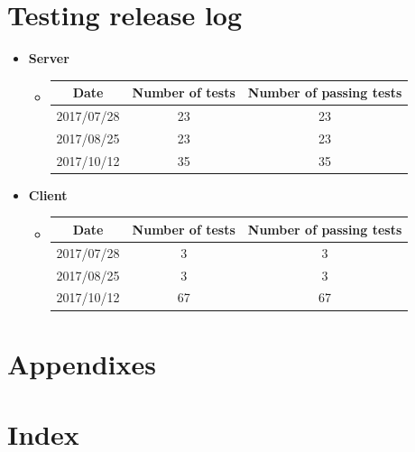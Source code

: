\documentclass[a4paper,12pt]{article}
\begin{document}
	\pagebreak
	\section{Testing release log}
	
	\begin{itemize}
		\item \textbf{Server}
		\begin{itemize}
			\item
				\begin{tabular}{ |c|c|c| } 
					\hline
					Date & Number of tests & Number of passing tests \\
					\hline
					2017/07/28 & 23 & 23\\
					\hline
					2017/08/25 & 23 & 23\\
					\hline
					2017/10/12 & 35 & 35\\
					\hline
				\end{tabular}
		\end{itemize}
 	\end{itemize}
 
	\begin{itemize}
 		\item \textbf{Client}
 		\begin{itemize}
 			\item
 			\begin{tabular}{ |c|c|c| } 
 				\hline
 				Date & Number of tests & Number of passing tests \\
 				\hline
 				2017/07/28 & 3 & 3\\
 				\hline
 				2017/08/25 & 3 & 3\\
 				\hline
 				2017/10/12 & 67 & 67\\
 				\hline
 			\end{tabular}
 		\end{itemize}
 	\end{itemize}  
   
    \section{Appendixes}
    
    \section{Index}
    \pagebreak  
\end{document}
